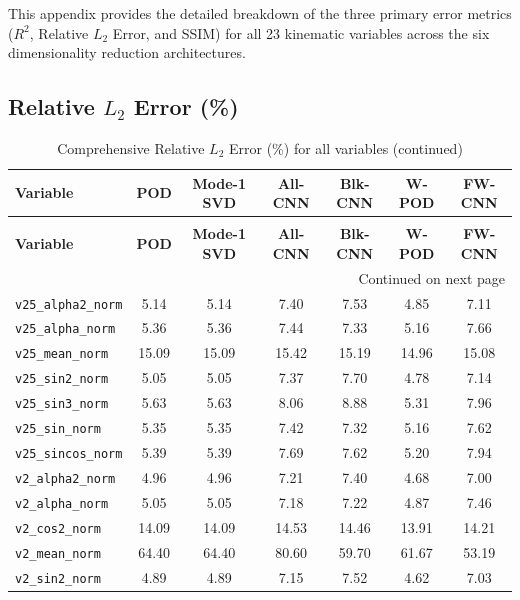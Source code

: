 \documentclass{article}
\begin{document}
This appendix provides the detailed breakdown of the three primary error metrics ($R^2$, Relative $L_2$ Error, and SSIM) for all 23 kinematic variables across the six dimensionality reduction architectures.

\subsection{Relative $L_2$ Error (\%)}
\begin{longtable}{l cccccc}
\caption{Comprehensive Relative $L_2$ Error (\%) for all variables.}\\
\toprule
\textbf{Variable} & \textbf{POD} & \textbf{Mode-1 SVD} & \textbf{All-CNN} & \textbf{Blk-CNN} & \textbf{W-POD} & \textbf{FW-CNN} \\
\midrule
\endfirsthead
\caption[]{Comprehensive Relative $L_2$ Error (\%) for all variables (continued)}\\
\toprule
\textbf{Variable} & \textbf{POD} & \textbf{Mode-1 SVD} & \textbf{All-CNN} & \textbf{Blk-CNN} & \textbf{W-POD} & \textbf{FW-CNN} \\
\midrule
\endhead
\midrule
\multicolumn{7}{r}{{Continued on next page}} \\
\bottomrule
\endfoot
\bottomrule
\endlastfoot
\texttt{v25\_alpha2\_norm} & 5.14 & 5.14 & 7.40 & 7.53 & 4.85 & 7.11 \\
\texttt{v25\_alpha\_norm} & 5.36 & 5.36 & 7.44 & 7.33 & 5.16 & 7.66 \\
\texttt{v25\_mean\_norm} & 15.09 & 15.09 & 15.42 & 15.19 & 14.96 & 15.08 \\
\texttt{v25\_sin2\_norm} & 5.05 & 5.05 & 7.37 & 7.70 & 4.78 & 7.14 \\
\texttt{v25\_sin3\_norm} & 5.63 & 5.63 & 8.06 & 8.88 & 5.31 & 7.96 \\
\texttt{v25\_sin\_norm} & 5.35 & 5.35 & 7.42 & 7.32 & 5.16 & 7.62 \\
\texttt{v25\_sincos\_norm} & 5.39 & 5.39 & 7.69 & 7.62 & 5.20 & 7.94 \\
\texttt{v2\_alpha2\_norm} & 4.96 & 4.96 & 7.21 & 7.40 & 4.68 & 7.00 \\
\texttt{v2\_alpha\_norm} & 5.05 & 5.05 & 7.18 & 7.22 & 4.87 & 7.46 \\
\texttt{v2\_cos2\_norm} & 14.09 & 14.09 & 14.53 & 14.46 & 13.91 & 14.21 \\
\texttt{v2\_mean\_norm} & 64.40 & 64.40 & 80.60 & 59.70 & 61.67 & 53.19 \\
\texttt{v2\_sin2\_norm} & 4.89 & 4.89 & 7.15 & 7.52 & 4.62 & 7.03 \\

\end{longtable}
\end{document}
